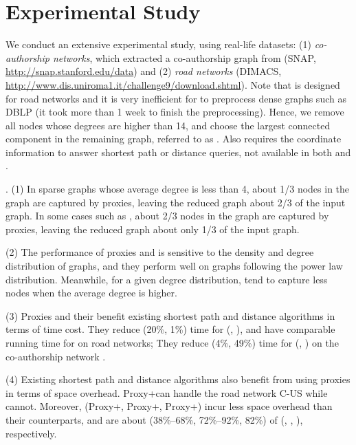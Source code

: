 \section{Experimental Study}
\label{sec-expt}


We conduct an extensive experimental study, using real-life datasets: 
%
(1) {\em co-authorship networks}, which extracted a co-authorship graph from \dblp (SNAP, \url{http://snap.stanford.edu/data})
 and (2) {\em road networks} (DIMACS, \url{http://www.dis.uniroma1.it/challenge9/download.shtml}).
Note that \tnr is designed for road networks and it is very inefficient for \tnr to preprocess dense graphs such as DBLP (it took more than 1 week to finish the preprocessing). Hence, we remove all nodes whose degrees are higher than 14, and choose the largest connected component in the remaining graph, referred to as \dblpone. Also \ah requires the coordinate information to answer shortest path or distance queries, not available in both \dblp and \dblpone.

.
(1) In sparse graphs whose average degree is less than 4, about 1/3 nodes in the graph are captured by proxies, leaving the reduced graph about 2/3 of the input graph. In some cases such as \dblpone, about 2/3 nodes in the graph are captured by proxies, leaving the reduced graph about only 1/3 of the input graph.

\sstab(2) The performance of proxies and \dras is sensitive to the density and degree distribution of graphs, and they perform well on graphs following the power law distribution. Meanwhile, for a given degree distribution, \dras tend to capture less nodes when the average degree is higher.

\sstab(3) Proxies and their \dras benefit existing shortest path and distance algorithms in terms of time cost. They reduce (20\%, 1\%) time for (\arcflag, \ah), and have comparable running time for \tnr on road networks; They reduce (4\%, 49\%) time for (\arcflag, \tnr) on the co-authorship network \dblpone.

\sstab(4) Existing shortest path and distance algorithms also benefit from using proxies in terms of space overhead. Proxy+\tnr can handle the road network C-US while \tnr cannot. Moreover, (Proxy+\arcflag, Proxy+\tnr, Proxy+\ah) incur less space overhead than their counterparts, and are about (38\%--68\%, 72\%--92\%, 82\%) of (\arcflag, \tnr, \ah), respectively.

